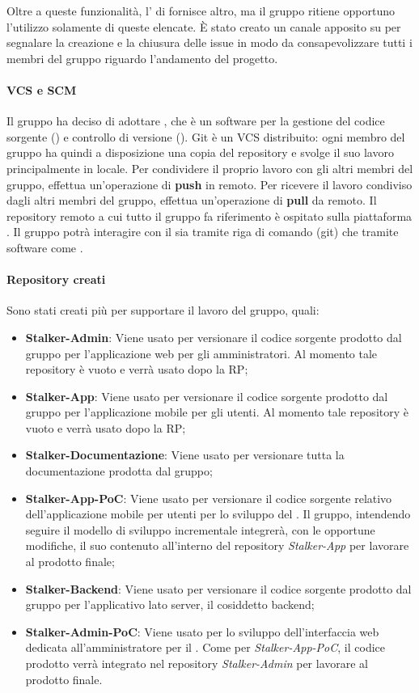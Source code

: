 Oltre a queste funzionalità, l' di  fornisce altro, ma il gruppo \Gruppo{} ritiene opportuno l'utilizzo solamente di queste elencate.
È stato creato un canale apposito su  per segnalare la creazione e la chiusura delle issue in modo da consapevolizzare tutti i membri del gruppo riguardo l'andamento del progetto.

\paragraph{VCS e SCM} 
Il gruppo ha deciso di adottare , che è un software per la gestione del codice sorgente () e controllo di versione ().
Git è un VCS distribuito: ogni membro del gruppo \Gruppo{} ha quindi a disposizione una copia del repository e svolge il suo lavoro principalmente in locale.
Per condividere il proprio lavoro con gli altri membri del gruppo, effettua un'operazione di \textbf{push} in remoto.
Per ricevere il lavoro condiviso dagli altri membri del gruppo, effettua un'operazione di \textbf{pull} da remoto.
Il repository remoto a cui tutto il gruppo fa riferimento è ospitato sulla piattaforma .
Il gruppo \Gruppo{} potrà interagire con il  sia tramite riga di comando (git) che tramite software come .

\paragraph{Repository creati}
Sono stati creati più  per supportare il lavoro del gruppo, quali:
\begin{itemize}
	\item \textbf{Stalker-Admin}: Viene usato per versionare il codice sorgente prodotto dal gruppo per l'applicazione web per gli amministratori. Al momento tale repository è vuoto e verrà usato dopo la RP;
	\item \textbf{Stalker-App}: Viene usato per versionare il codice sorgente prodotto dal gruppo per l'applicazione mobile per gli utenti. Al momento tale repository è vuoto e verrà usato dopo la RP;
	\item \textbf{Stalker-Documentazione}: Viene usato per versionare tutta la documentazione prodotta dal gruppo;
	\item \textbf{Stalker-App-PoC}: Viene usato per versionare il codice sorgente relativo dell'applicazione mobile per utenti per lo sviluppo del .
	Il gruppo, intendendo seguire il modello di sviluppo incrementale integrerà, con le opportune modifiche, il suo contenuto all'interno del repository \textit{Stalker-App} per lavorare al prodotto finale;
	\item \textbf{Stalker-Backend}: Viene usato per versionare il codice sorgente prodotto dal gruppo per l'applicativo lato server, il cosiddetto backend;
	\item \textbf{Stalker-Admin-PoC}: Viene usato per lo sviluppo dell'interfaccia web dedicata all'amministratore per il .
	Come per \textit{Stalker-App-PoC}, il codice prodotto verrà integrato nel repository \textit{Stalker-Admin} per lavorare al prodotto finale.
\end{itemize}

